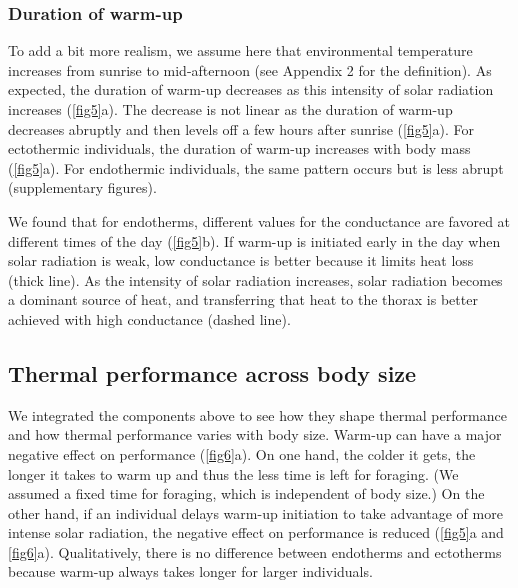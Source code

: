 \subsubsection*{Duration of warm-up}
To add a bit more realism, we assume here that environmental temperature increases from sunrise to mid-afternoon (see Appendix 2 for the definition).
As expected, the duration of warm-up decreases as this intensity of solar radiation increases (\cref{fig5}a).
The decrease is not linear as the duration of  warm-up decreases abruptly and then levels off a few hours after sunrise (\cref{fig5}a).
For ectothermic individuals, the duration of warm-up increases with body mass (\cref{fig5}a).
For endothermic individuals, the same pattern occurs but is less abrupt (supplementary figures).

We found that for endotherms, different values for the conductance are favored at different times of the day (\cref{fig5}b).
If warm-up is initiated early in the day when solar radiation is weak, low conductance is better because it limits heat loss (thick line).
As the intensity of solar radiation increases, solar radiation becomes a dominant source of heat, and transferring that heat to the thorax is better achieved with high conductance (dashed line).

\subsection*{Thermal performance across body size}
 We integrated the components above to see how they shape thermal performance and how thermal performance varies with body size.
Warm-up can have a major negative effect on performance (\cref{fig6}a).
On one hand, the colder it gets, the longer it takes to warm up and thus the less time is left for foraging.
(We assumed a fixed time for foraging, which is independent of body size.)
On the other hand, if an individual delays warm-up initiation to take advantage of more intense solar radiation, the negative effect on performance is reduced (\cref{fig5}a and \cref{fig6}a). %
Qualitatively, there is no difference between endotherms and ectotherms because warm-up always takes longer for larger individuals.  %

